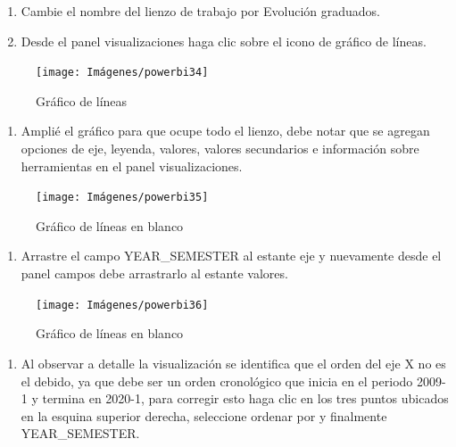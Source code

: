 \documentclass[
]{book}
\providecommand{\tightlist}{%
  \setlength{\itemsep}{0pt}\setlength{\parskip}{0pt}}
\begin{document}
\begin{enumerate}
\def\labelenumi{\arabic{enumi}.}
\item
  Cambie el nombre del lienzo de trabajo por Evolución graduados.
\item
  Desde el panel visualizaciones haga clic sobre el icono de gráfico de líneas.
\end{enumerate}

\begin{figure}

{\centering \texttt{[image: Imágenes/powerbi34]} 

}

\caption{Gráfico de líneas}\label{fig:Agregargraficolineas-fig}
\end{figure}

\begin{enumerate}
\def\labelenumi{\arabic{enumi}.}
\setcounter{enumi}{2}
\tightlist
\item
  Amplié el gráfico para que ocupe todo el lienzo, debe notar que se agregan opciones de eje, leyenda, valores, valores secundarios e información sobre herramientas en el panel visualizaciones.
\end{enumerate}

\begin{figure}

{\centering \texttt{[image: Imágenes/powerbi35]} 

}

\caption{Gráfico de líneas en blanco}\label{fig:paso3lineaspowerbi-fig}
\end{figure}

\begin{enumerate}
\def\labelenumi{\arabic{enumi}.}
\setcounter{enumi}{3}
\tightlist
\item
  Arrastre el campo YEAR\_SEMESTER al estante eje y nuevamente desde el panel campos debe arrastrarlo al estante valores.
\end{enumerate}

\begin{figure}

{\centering \texttt{[image: Imágenes/powerbi36]} 

}

\caption{Gráfico de líneas en blanco}\label{fig:paso4lineaspowerbi-fig}
\end{figure}

\begin{enumerate}
\def\labelenumi{\arabic{enumi}.}
\setcounter{enumi}{4}
\tightlist
\item
  Al observar a detalle la visualización se identifica que el orden del eje X no es el debido, ya que debe ser un orden cronológico que inicia en el periodo 2009-1 y termina en 2020-1, para corregir esto haga clic en los tres puntos ubicados en la esquina superior derecha, seleccione ordenar por y finalmente YEAR\_SEMESTER.
\end{enumerate}
\end{document}
